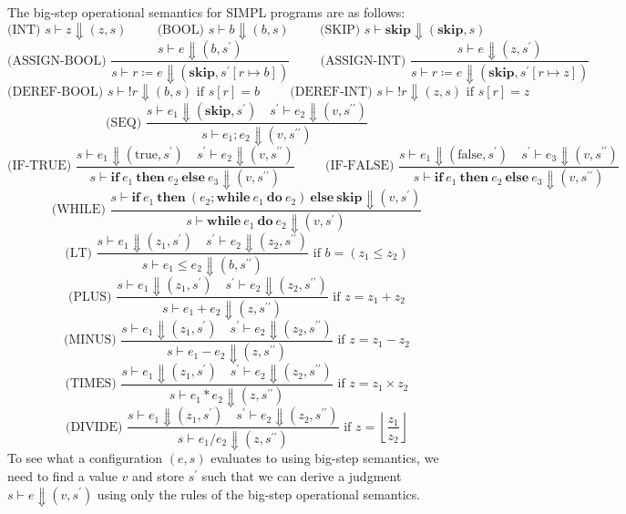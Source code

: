 The big-step operational semantics for SIMPL programs are as follows:
\[
  \text{(INT) } s \vdash z \Downarrow (z, s) \hspace{1cm} 
  \text{(BOOL) } s \vdash b \Downarrow (b, s) \hspace{1cm} 
  \text{(SKIP) } s \vdash \mathbf{skip} \Downarrow (\mathbf{skip}, s)
\]
\[
  \text{(ASSIGN-BOOL) } \dfrac{s \vdash e \Downarrow (b, s^{\prime})}{s \vdash r \coloneqq e \Downarrow (\mathbf{skip}, s^{\prime}[r \mapsto b])}
  \hspace{1cm}
  \text{(ASSIGN-INT) } \dfrac{s \vdash e \Downarrow (z, s^{\prime})}{s \vdash r \coloneqq e \Downarrow (\mathbf{skip}, s^{\prime}[r \mapsto z])}
\]
\[
  \text{(DEREF-BOOL) } s \vdash !r \Downarrow (b, s) \text{ if } s[r] = b 
  \hspace{1cm}
  \text{(DEREF-INT) } s \vdash !r \Downarrow (z, s) \text{ if } s[r] = z
\]
\[
  \text{(SEQ) } \dfrac{s \vdash e_1 \Downarrow (\mathbf{skip}, s^{\prime}) \quad s^{\prime} \vdash e_2 \Downarrow (v, s^{\prime\prime})}{s \vdash e_1 ; e_2 \Downarrow (v, s^{\prime\prime})}
\]
\[
  \text{(IF-TRUE) } \dfrac{s \vdash e_1 \Downarrow (\text{true}, s^{\prime}) \quad s^{\prime} \vdash e_2 \Downarrow (v, s^{\prime\prime})}{s \vdash \mathbf{if}\ e_1\ \mathbf{then}\ e_2\ \mathbf{else}\ e_3 \Downarrow (v, s^{\prime\prime})} \hspace{1cm} \text{(IF-FALSE) } \dfrac{s \vdash e_1 \Downarrow (\text{false}, s^{\prime}) \quad s^{\prime} \vdash e_3 \Downarrow (v, s^{\prime\prime})}{s \vdash \mathbf{if}\ e_1\ \mathbf{then}\ e_2\ \mathbf{else}\ e_3 \Downarrow (v, s^{\prime\prime})}
\]
\[
  \text{(WHILE) } \dfrac{s \vdash \mathbf{if}\ e_1\ \mathbf{then}\ (e_2; \mathbf{while}\ e_1\ \mathbf{do}\ e_2)\ \mathbf{else}\ \mathbf{skip} \Downarrow (v, s^{\prime})}{s \vdash \mathbf{while}\ e_1\ \mathbf{do}\ e_2 \Downarrow (v, s^{\prime})}
\]
\[
  \text{(LT) } \dfrac{s \vdash e_1 \Downarrow (z_1, s^{\prime}) \quad s^{\prime} \vdash e_2 \Downarrow (z_2, s^{\prime\prime})}{s \vdash e_1 \leq e_2 \Downarrow (b, s^{\prime\prime})} \text{ if } b = (z_1 \leq z_2)
\]
\[
  \text{(PLUS) } \dfrac{s \vdash e_1 \Downarrow (z_1, s^{\prime}) \quad s^{\prime} \vdash e_2 \Downarrow (z_2, s^{\prime\prime})}{s \vdash e_1 + e_2 \Downarrow (z, s^{\prime\prime})} \text{ if } z = z_1 + z_2
\]
\[
  \text{(MINUS) } \dfrac{s \vdash e_1 \Downarrow (z_1, s^{\prime}) \quad s^{\prime} \vdash e_2 \Downarrow (z_2, s^{\prime\prime})}{s \vdash e_1 - e_2 \Downarrow (z, s^{\prime\prime})} \text{ if } z = z_1 - z_2
\]
\[
  \text{(TIMES) } \dfrac{s \vdash e_1 \Downarrow (z_1, s^{\prime}) \quad s^{\prime} \vdash e_2 \Downarrow (z_2, s^{\prime\prime})}{s \vdash e_1 * e_2 \Downarrow (z, s^{\prime\prime})} \text{ if } z = z_1 \times z_2
\]
\[
  \text{(DIVIDE) } \dfrac{s \vdash e_1 \Downarrow (z_1, s^{\prime}) \quad s^{\prime} \vdash e_2 \Downarrow (z_2, s^{\prime\prime})}{s \vdash e_1 / e_2 \Downarrow (z, s^{\prime\prime})} \text{ if } z = \left\lfloor \dfrac{z_1}{z_2} \right\rfloor
\]
To see what a configuration \((e, s)\) evaluates to using big-step semantics, we need to find a value \(v\) and store \(s^{\prime}\) such that we can derive a judgment \(s \vdash e \Downarrow (v, s^{\prime})\) using only the rules of the big-step operational semantics.

